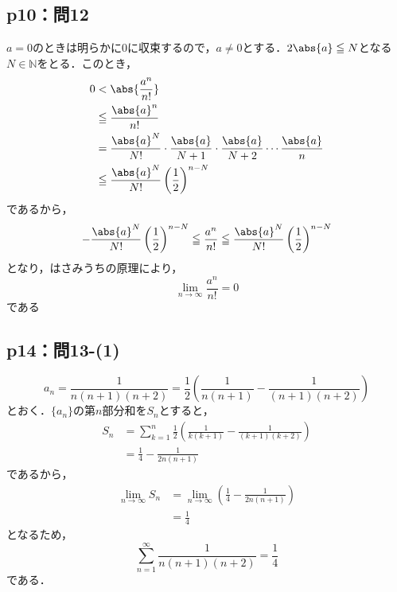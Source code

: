 \documentclass[uplatex,dvipdfmx,a4paper,10pt,fleqn]{jsarticle}
\begin{document}
         
        \subsection*{p10：問12}

\begin{tleftbar}
    $a=0$のときは明らかに$0$に収束するので，$a \ne 0$とする．$2\abs{a} \leqq N$となる$N \in \mathbb{N}$をとる．このとき，
    \begin{align*}
         0 &< \abs{ \frac{a^n}{n!} } \\
         &\leqq \frac{\abs{a}^n}{n!} \\
         &= \frac{\abs{a}^{N}}{N!} \cdot \frac{\abs{a}}{N+1} \cdot \frac{\abs{a}}{N+2} \dotsm \frac{\abs{a}}{n} \\
         & \leqq  \frac{\abs{a}^{N}}{N!} \left(\frac{1}{2} \right)^{n-N}
    \end{align*}
    であるから，
    \[
        - \frac{\abs{a}^{N}}{N!} \left(\frac{1}{2} \right)^{n-N} \leqq  \frac{a^n}{n!} \leqq \frac{\abs{a}^{N}}{N!} \left(\frac{1}{2} \right)^{n-N}
    \]
    となり，はさみうちの原理により，
    \[
        \lim_{n \to \infty} \frac{a^n}{n!} =0
    \]
    である
\end{tleftbar}

\newpage


\subsection*{p14：問13-(1)}

\begin{tleftbar}
\[
   a_n = \frac{1}{n (n+1)(n+2)} = \frac{1}{2} \left ( \frac{1}{n(n+1)}- \frac{1}{(n+1)(n+2)} \right)
\]
とおく．$\{ a_n \}$の第$n$部分和を$S_n$とすると，
\begin{align*} 
    S_n & = \sum_{k=1}^{n}  \frac{1}{2} \left ( \frac{1}{k(k+1)}-\frac{1}{(k+1)(k+2)} \right) \\
    & = \frac{1}{4} - \frac{1}{2n(n+1)}
\end{align*} 
であるから，
\begin{align*}
    \lim_{n \to \infty} S_n &= \lim_{n \to \infty} \left (  \frac{1}{4} - \frac{1}{2n(n+1)} \right) \\
    &= \frac{1}{4}
\end{align*}
となるため，
\[
    \sum_{n=1}^{\infty} \frac{1}{n (n+1)(n+2)} = \frac{1}{4}
\]
である．
\end{tleftbar}
\end{document}
